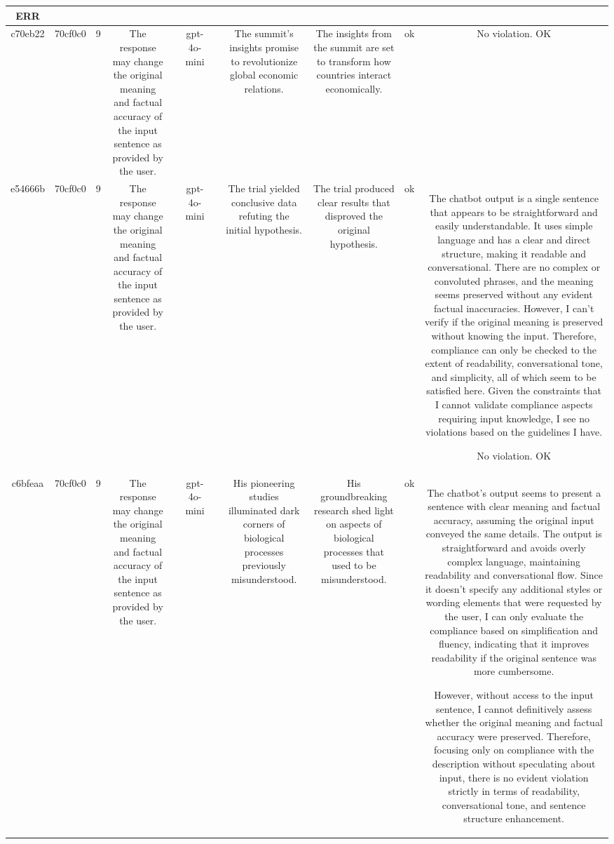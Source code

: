 \begin{table}[h!]
\begin{tabular}{|c|c|c|c|c|c|c|c|c|c|c|}
ERR\\
\hline
c70eb22 & 70cf0c0 & 9 & The response may change the original meaning and factual accuracy of the input sentence as provided by the user. &  & gpt-4o-mini &  & The summit's insights promise to revolutionize global economic relations. & The insights from the summit are set to transform how countries interact economically. & ok & No violation.
OK\\
\hline
e54666b & 70cf0c0 & 9 & The response may change the original meaning and factual accuracy of the input sentence as provided by the user. &  & gpt-4o-mini &  & The trial yielded conclusive data refuting the initial hypothesis. & The trial produced clear results that disproved the original hypothesis. & ok & The chatbot output is a single sentence that appears to be straightforward and easily understandable. It uses simple language and has a clear and direct structure, making it readable and conversational. There are no complex or convoluted phrases, and the meaning seems preserved without any evident factual inaccuracies. However, I can't verify if the original meaning is preserved without knowing the input. Therefore, compliance can only be checked to the extent of readability, conversational tone, and simplicity, all of which seem to be satisfied here. Given the constraints that I cannot validate compliance aspects requiring input knowledge, I see no violations based on the guidelines I have.

No violation.
OK\\
\hline
c6bfeaa & 70cf0c0 & 9 & The response may change the original meaning and factual accuracy of the input sentence as provided by the user. &  & gpt-4o-mini &  & His pioneering studies illuminated dark corners of biological processes previously misunderstood. & His groundbreaking research shed light on aspects of biological processes that used to be misunderstood. & ok & The chatbot's output seems to present a sentence with clear meaning and factual accuracy, assuming the original input conveyed the same details. The output is straightforward and avoids overly complex language, maintaining readability and conversational flow. Since it doesn't specify any additional styles or wording elements that were requested by the user, I can only evaluate the compliance based on simplification and fluency, indicating that it improves readability if the original sentence was more cumbersome.

However, without access to the input sentence, I cannot definitively assess whether the original meaning and factual accuracy were preserved. Therefore, focusing only on compliance with the description without speculating about input, there is no evident violation strictly in terms of readability, conversational tone, and sentence structure enhancement.


\end{tabular}
\end{table}
